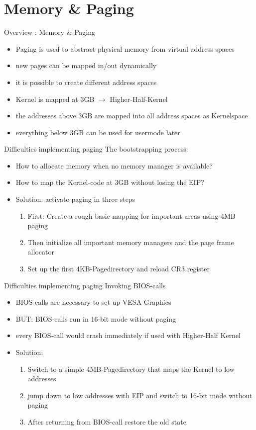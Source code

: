 \section{Memory \& Paging}

\begin{frame}{Overview : Memory \& Paging}
\begin{itemize}
	\item Paging is used to abstract physical memory from virtual address spaces
	\item new pages can be mapped in/out dynamically
	\item it is possible to create different address spaces
	\item Kernel is mapped at 3GB $\rightarrow$ Higher-Half-Kernel
	\item the addresses above 3GB are mapped into all address spaces as Kernelspace
	\item everything below 3GB can be used for usermode later
\end{itemize}	
\end{frame}

\begin{frame}{Difficulties implementing paging}
The bootstrapping process:
\begin{itemize}
\item How to allocate memory when no memory manager is available?
\item How to map the Kernel-code at 3GB without losing the EIP?
\item Solution: activate paging in three steps
\begin{enumerate}
	\item First: Create a rough basic mapping for important areas using 4MB paging
	\item Then initialize all important memory managers and the page frame allocator
	\item Set up the first 4KB-Pagedirectory and reload CR3 register
\end{enumerate}
\end{itemize}	
\end{frame}

\begin{frame}{Difficulties implementing paging}
Invoking BIOS-calls
\begin{itemize}
\item BIOS-calls are necessary to set up VESA-Graphics
\item BUT: BIOS-calls run in 16-bit mode without paging
\item every BIOS-call would crash immediately if used with Higher-Half Kernel
\item Solution:
\begin{enumerate}
\item Switch to a simple 4MB-Pagedirectory that maps the Kernel to low addresses
\item jump down to low addresses with EIP and switch to 16-bit mode without paging
\item After returning from BIOS-call restore the old state
\end{enumerate}
\end{itemize}	
\end{frame}